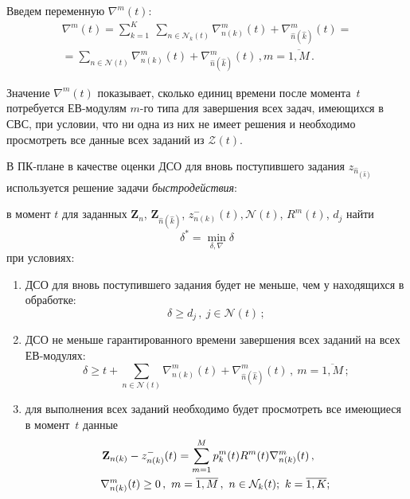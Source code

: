 \begin{multicols}{2}
Введем переменную $\nabla ^m (t )$:
\begin{multline*}
\nabla ^m (t ) = \sum\limits_{k = 1}^K \ \sum_{n \in \mathcal{N}_k(t) } \nabla _{n(k)} ^m (t ) + 
 \nabla _{\hat n{(\hat{k})}}^m (t )  = {}\\
{}= \sum\limits_{n \in \mathcal{N}(t) } \nabla _{n(k)} ^m (t ) + \nabla _{\hat n{(\hat{k})}}^m (t )\,,
m = \overline {1, M}\,.
\end{multline*}

Значение $\nabla ^m (t )$ показывает, сколько единиц времени после момента~$t$ потребуется 
ЕВ-мо\-ду\-лям $m$-го типа для завершения всех задач, имеющихся в СВС, при условии, что ни 
одна из них не имеет решения и необходимо  просмотреть все данные всех заданий из $\mathcal{Z}(t)$.

В ПК-плане в качестве оценки ДСО для вновь поступившего задания  $z_{\hat n_{(\hat{k})}}$ 
используется решение  задачи \textit{быстродействия}:

\smallskip

\noindent
в момент $t$ для заданных $\mathbf{Z}_n$, $\mathbf{Z}_{\hat n{(\hat{k})}}$, 
$z^-_{n(k)}(t), \mathcal{N}(t)$,  $R^m(t)$, $d_j$ найти
\begin{equation*}
 \delta^* =\min\limits_{\delta, \nabla} \delta
\end{equation*}
при условиях:
\begin{enumerate}[(1)]
\item ДСО для вновь поступившего задания будет  не меньше, чем у находящихся в обработке:
\begin{equation*}
\delta \ge d_j\,,\ j \in \mathcal{N}(t)\,;
\end{equation*}
\item ДСО не меньше гарантированного времени завершения всех заданий на всех ЕВ-модулях:
\begin{equation*}
\delta \ge t + \sum\limits_{n \in \mathcal{N}(t) } \nabla _{n(k)}^m (t) +  \nabla _{\hat n{(\hat{k})}}^m 
(t)\,,\ m = \overline {1, M}\,; 
\end{equation*}
\item для выполнения всех заданий необходимо будет просмотреть все имеющиеся в момент~$t$ данные
\begin{multline*}
\hspace*{-5mm}\mathbf{Z}_{n(k)} - z^-_{n(k)}(t) =  \displaystyle\sum\limits_{ m = 1}^{M} p_k^m(t) R^m(t) \nabla _{n(k)}^m (t)\,,\\
\!\nabla _{n(k)}^m (t ) \ge 0\,,  \ m = \overline {1, M}\,,\ n \in \mathcal{N}_k(t);\ 
k = \overline{1, K};
\end{multline*}


\end{enumerate}
\end{multicols}

